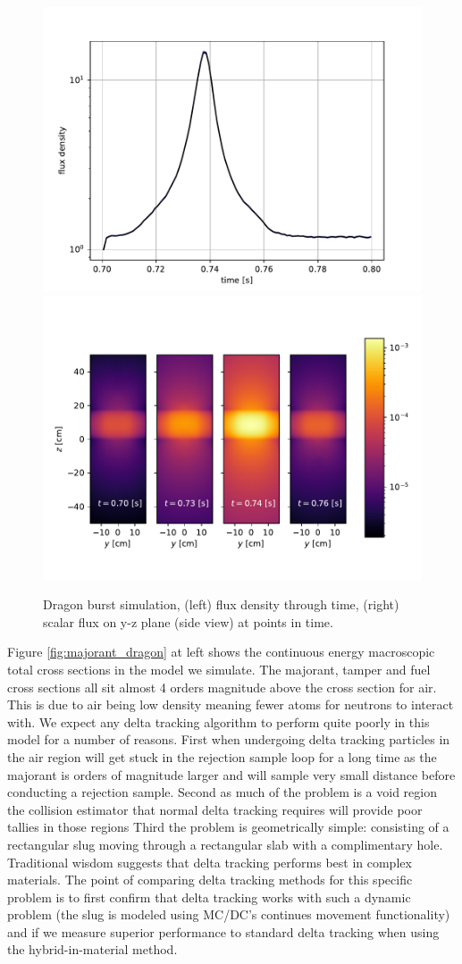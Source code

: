 \begin{figure}
    \centering
    \includegraphics[width=0.48\linewidth]{figures/delta_figs/dragon/dragon_curve.pdf}
    \includegraphics[width=0.48\linewidth]{figures/delta_figs/dragon/flux_dragon.pdf}
    \caption{Dragon burst simulation, (left) flux density through time, (right) scalar flux on y-z plane (side view) at points in time.}
    \label{fig:dragon_results}
\end{figure}

Figure \ref{fig:majorant_dragon} at left shows the continuous energy macroscopic total cross sections in the model we simulate.
The majorant, tamper and fuel cross sections all sit almost 4 orders magnitude above the cross section for air.
This is due to air being low density meaning fewer atoms for neutrons to interact with.
We expect any delta tracking algorithm to perform quite poorly in this model for a number of reasons.
First when undergoing delta tracking particles in the air region will get stuck in the rejection sample loop for a long time as the majorant is orders of magnitude larger and will sample very small distance before conducting a rejection sample.
Second as much of the problem is a void region the collision estimator that normal delta tracking requires will provide poor tallies in those regions
Third the problem is geometrically simple: consisting of a rectangular slug moving through a rectangular slab with a complimentary hole.
Traditional wisdom suggests that delta tracking performs best in complex materials.
The point of comparing delta tracking methods for this specific problem is to first confirm that delta tracking works with such a dynamic problem (the slug is modeled using MC/DC's continues movement functionality) and if we measure superior performance to standard delta tracking when using the hybrid-in-material method.


